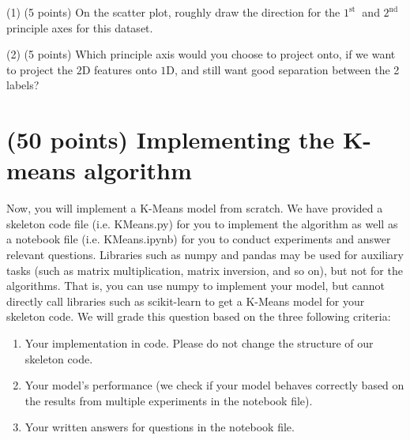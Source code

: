 \documentclass[12pt]{article}%
\begin{document}
(1) (5 points) On the scatter plot, roughly draw the direction for the $1^{\text {st }}$ and $2^{\text {nd }}$ principle axes for this dataset.

(2) (5 points) Which principle axis would you choose to project onto, if we want to project the $2 \mathrm{D}$ features onto $1 \mathrm{D}$, and still want good separation between the 2 labels?

\newpage

\section{(50 points) Implementing the K-means algorithm}

Now, you will implement a K-Means model from scratch. We have provided a skeleton code file (i.e. KMeans.py) for you to implement the algorithm as well as a notebook file (i.e. KMeans.ipynb) for you to conduct experiments and answer relevant questions. Libraries such as numpy and pandas may be used for auxiliary tasks (such as matrix multiplication, matrix inversion, and so on), but not for the algorithms. That is, you can use numpy to implement your model, but cannot directly call libraries such as scikit-learn to get a K-Means model for your skeleton code. We will grade this question based on the three following criteria:

\begin{enumerate}
    \item Your implementation in code. Please do not change the structure of our skeleton code.
    \item Your model’s performance (we check if your model behaves correctly based on the results from multiple experiments in the notebook file).
    \item Your written answers for questions in the notebook file.
\end{enumerate}
\end{document}
